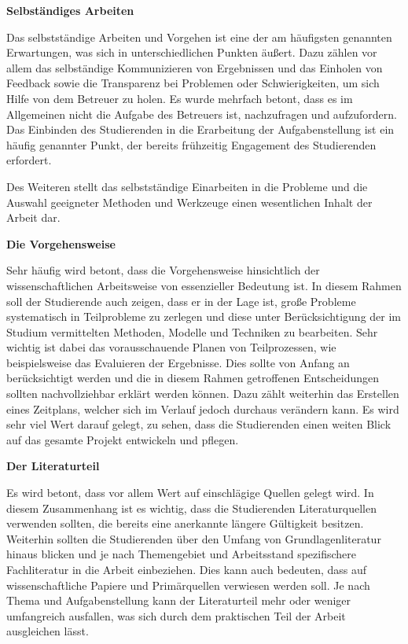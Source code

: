 \documentclass[bibliography=totoc,listof=totoc,BCOR=5mm,DIV=12,oneside]{scrbook}
\begin{document}
\par \bigskip \textbf{Selbständiges Arbeiten}
\par Das selbstständige Arbeiten und Vorgehen ist eine der am häufigsten genannten Erwartungen, was sich in unterschiedlichen Punkten äußert. Dazu zählen vor allem das selbständige Kommunizieren von Ergebnissen und das Einholen von Feedback sowie die Transparenz bei Problemen oder Schwierigkeiten, um sich Hilfe von dem Betreuer zu holen. Es wurde mehrfach betont, dass es im Allgemeinen nicht die Aufgabe des Betreuers ist, nachzufragen und aufzufordern. Das Einbinden des Studierenden in die Erarbeitung der Aufgabenstellung ist ein häufig genannter Punkt, der bereits frühzeitig Engagement des Studierenden erfordert.
\par Des Weiteren stellt das selbstständige Einarbeiten in die Probleme und die Auswahl geeigneter Methoden und Werkzeuge einen wesentlichen Inhalt der Arbeit dar.
\par \bigskip \textbf{Die Vorgehensweise}
\par Sehr häufig wird betont, dass die Vorgehensweise hinsichtlich der wissenschaftlichen Arbeitsweise von essenzieller Bedeutung ist. In diesem Rahmen soll der Studierende auch zeigen, dass er in der Lage ist, große Probleme systematisch in Teilprobleme zu zerlegen und diese unter Berücksichtigung der im Studium vermittelten Methoden, Modelle und Techniken zu bearbeiten. Sehr wichtig ist dabei das vorausschauende Planen von Teilprozessen, wie beispielsweise das Evaluieren der Ergebnisse. Dies sollte von Anfang an berücksichtigt werden und die in diesem Rahmen getroffenen Entscheidungen sollten nachvollziehbar erklärt werden können. Dazu zählt weiterhin das Erstellen eines Zeitplans, welcher sich im Verlauf jedoch durchaus verändern kann. Es wird sehr viel Wert darauf gelegt, zu sehen, dass die Studierenden einen weiten Blick auf das gesamte Projekt entwickeln und pflegen.
\par \bigskip \textbf{Der Literaturteil}
\par Es wird betont, dass vor allem Wert auf einschlägige Quellen gelegt wird. In diesem Zusammenhang ist es wichtig, dass die Studierenden Literaturquellen verwenden sollten, die bereits eine anerkannte längere Gültigkeit besitzen. Weiterhin sollten die Studierenden über den Umfang von Grundlagenliteratur hinaus blicken und je nach Themengebiet und Arbeitsstand spezifischere Fachliteratur in die Arbeit einbeziehen. Dies kann auch bedeuten, dass auf wissenschaftliche Papiere und Primärquellen verwiesen werden soll. Je nach Thema und Aufgabenstellung kann der Literaturteil mehr oder weniger umfangreich ausfallen, was sich durch dem praktischen Teil der Arbeit ausgleichen lässt.
\end{document}
